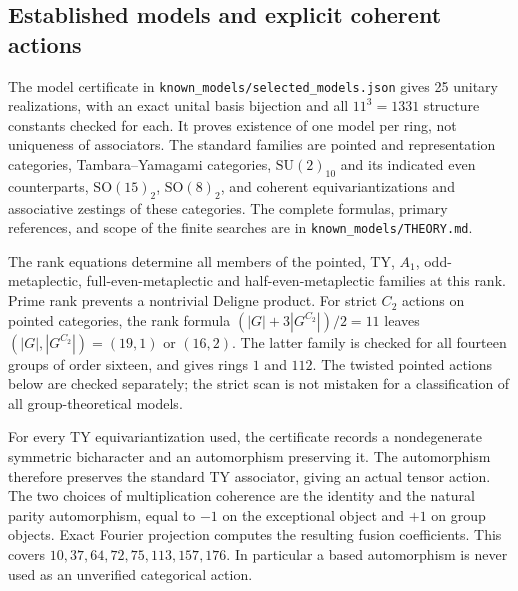 \subsection{Established models and explicit coherent actions}
The model certificate in \texttt{known\_models/selected\_models.json} gives
25 unitary realizations, with an exact unital basis bijection and all
$11^3=1331$ structure constants checked for each.  It proves existence of
one model per ring, not uniqueness of associators.  The standard families
are pointed and representation categories, Tambara--Yamagami categories,
$\mathrm{SU}(2)_{10}$ and its indicated even counterparts,
$\mathrm{SO}(15)_2$, $\mathrm{SO}(8)_2$, and coherent equivariantizations
and associative zestings of these categories.  The complete formulas,
primary references, and scope of the finite searches are in
\texttt{known\_models/THEORY.md}.

The rank equations determine all members of the pointed, TY, $A_1$,
odd-metaplectic, full-even-metaplectic and half-even-metaplectic families
at this rank.  Prime rank prevents a nontrivial Deligne product.
For strict $C_2$ actions on pointed categories, the rank formula
$(|G|+3|G^{C_2}|)/2=11$ leaves $(|G|,|G^{C_2}|)=(19,1)$ or $(16,2)$.
The latter family is checked for all fourteen groups of order sixteen,
and gives rings $1$ and $112$.  The twisted pointed actions below are
checked separately; the strict scan is not mistaken for a classification
of all group-theoretical models.

For every TY equivariantization used, the certificate records a
nondegenerate symmetric bicharacter and an automorphism preserving it.
The automorphism therefore preserves the standard TY associator, giving
an actual tensor action.  The two choices of multiplication coherence
are the identity and the natural parity automorphism, equal to $-1$ on
the exceptional object and $+1$ on group objects.  Exact Fourier
projection computes the resulting fusion coefficients.  This covers
$10,37,64,72,75,113,157,176$.  In particular a based automorphism is
never used as an unverified categorical action.

